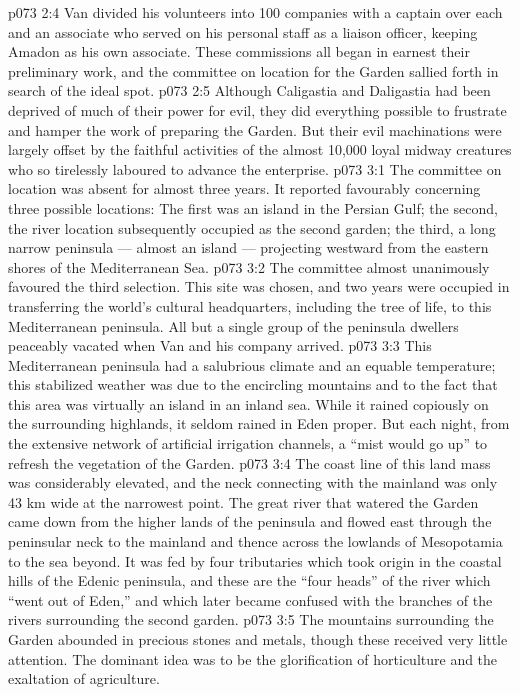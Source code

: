 \vs p073 2:4 Van divided his volunteers into 100 companies with a captain over each and an associate who served on his personal staff as a liaison officer, keeping Amadon as his own associate. These commissions all began in earnest their preliminary work, and the committee on location for the Garden sallied forth in search of the ideal spot.
\vs p073 2:5 \pc Although Caligastia and Daligastia had been deprived of much of their power for evil, they did everything possible to frustrate and hamper the work of preparing the Garden. But their evil machinations were largely offset by the faithful activities of the almost 10,000 loyal midway creatures who so tirelessly laboured to advance the enterprise.
\vs p073 3:1 The committee on location was absent for almost three years. It reported favourably concerning three possible locations: The first was an island in the Persian Gulf; the second, the river location subsequently occupied as the second garden; the third, a long narrow peninsula --- almost an island --- projecting westward from the eastern shores of the Mediterranean Sea.
\vs p073 3:2 The committee almost unanimously favoured the third selection. This site was chosen, and two years were occupied in transferring the world’s cultural headquarters, including the tree of life, to this Mediterranean peninsula. All but a single group of the peninsula dwellers peaceably vacated when Van and his company arrived.
\vs p073 3:3 \pc This Mediterranean peninsula had a salubrious climate and an equable temperature; this stabilized weather was due to the encircling mountains and to the fact that this area was virtually an island in an inland sea. While it rained copiously on the surrounding highlands, it seldom rained in Eden proper. But each night, from the extensive network of artificial irrigation channels, a “mist would go up” to refresh the vegetation of the Garden.
\vs p073 3:4 The coast line of this land mass was considerably elevated, and the neck connecting with the mainland was only 43 km wide at the narrowest point. The great river that watered the Garden came down from the higher lands of the peninsula and flowed east through the peninsular neck to the mainland and thence across the lowlands of Mesopotamia to the sea beyond. It was fed by four tributaries which took origin in the coastal hills of the Edenic peninsula, and these are the “four heads” of the river which “went out of Eden,” and which later became confused with the branches of the rivers surrounding the second garden.
\vs p073 3:5 The mountains surrounding the Garden abounded in precious stones and metals, though these received very little attention. The dominant idea was to be the glorification of horticulture and the exaltation of agriculture.
